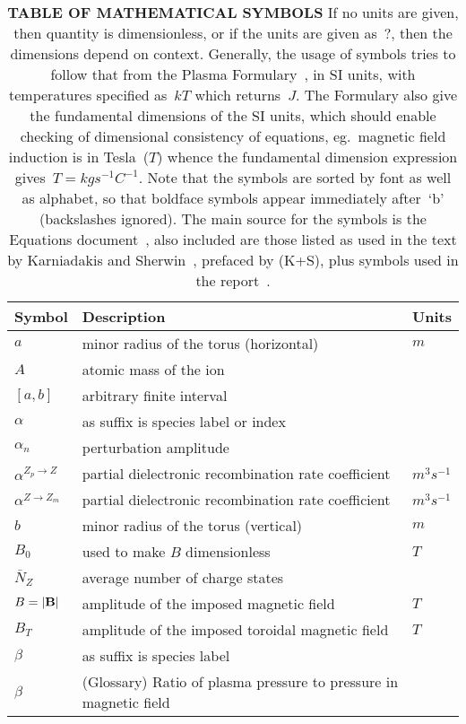 \begin{longtable}{|p{3.0cm}|p{10.0cm}|p{3.0cm}|}
\caption{\textbf{\textsf{TABLE OF MATHEMATICAL SYMBOLS}}
If no units are given, then quantity is dimensionless, or if the units are given as~$?$,
then the dimensions depend on context.
Generally, the usage of symbols tries to follow that from the Plasma Formulary~\cite{NRLpf07},
in SI units, with temperatures specified as~$kT$ which returns~$J$. The Formulary also
give the fundamental dimensions of the SI units, which should enable checking of dimensional consistency of
equations, eg.\ magnetic field induction is in Tesla~($T$) whence the fundamental
dimension expression gives~$T=kg s^{-1} C^{-1}$.
Note that the symbols are sorted by font as well as alphabet, so that boldface symbols
appear immediately after~`b' (backslashes ignored). The main source for the symbols is
the Equations document~\cite{pappeqs}, also included are those listed as used in the text by
Karniadakis and Sherwin~\cite{karniadakissherwin}, prefaced by (K+S), plus symbols used in the
report~\cite{y2re313}. \label{tab:symbols}
} \\
\hline
\textbf{\textsf{Symbol}} & \textbf{\textsf{Description}}  & \textbf{\textsf{Units}} \\
\hline
$a$ & minor radius of the torus (horizontal) & $m$ \\
$A$ & atomic mass of the ion &  \\
$[a,b]$ & arbitrary finite interval  & \\
$\alpha$ & as suffix is species label or index &  \\
$\alpha_n$ & perturbation amplitude &  \\
$\alpha^{Z_p\rightarrow Z}$ & partial dielectronic recombination rate coefficient  & $m^3 s^{-1}$  \\
$\alpha^{Z\rightarrow Z_m}$ & partial dielectronic recombination rate coefficient  & $m^3 s^{-1}$  \\
$b$ & minor radius of the torus (vertical) & $m$ \\
$B_0$ & used to make $B$ dimensionless  &  $T$  \\
$\bar{N}_Z$ & average number of charge states  &   \\
$B=|{\bf B}|$ & amplitude of the imposed magnetic field  &  $T$  \\
$B_T$ & amplitude of the imposed toroidal magnetic field  &  $T$ \\
$\beta$ & as suffix is species label & \\
$\beta$ & (Glossary) Ratio of plasma pressure to pressure in magnetic field &  \\

\end{longtable}

